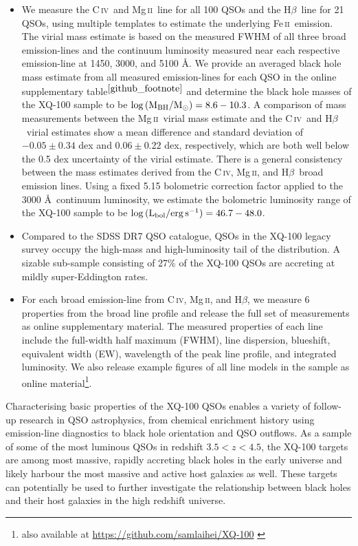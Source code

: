 \documentclass[fleqn,usenatbib]{mnras}
\newcommand{\mgii}{Mg\,\textsc{ii}}
\newcommand{\civ}{C\,\textsc{iv}}
\newcommand{\feii}{Fe\,\textsc{ii}}
\newcommand{\hbeta}{H\textsc{$\beta$}}
\begin{document}
\begin{itemize}
    \item We measure the \civ\ and \mgii\ line for all 100 QSOs and the \hbeta\ line for 21 QSOs, using multiple templates to estimate the underlying \feii\ emission. The virial mass estimate is based on the measured FWHM of all three broad emission-lines and the continuum luminosity measured near each respective emission-line at 1450, 3000, and 5100 \AA. We provide an averaged black hole mass estimate from all measured emission-lines for each QSO in the online supplementary table$^{\ref{github_footnote}}$ and determine the black hole masses of the XQ-100 sample to be $\log{(\rm{M_{BH}}/\rm{M_\odot})} = 8.6-10.3$. A comparison of mass measurements between the \mgii\ virial mass estimate and the \civ\ and \hbeta\ virial estimates show a mean difference and standard deviation of $-0.05 \pm 0.34$ dex and $0.06 \pm 0.22$ dex, respectively, which are both well below the 0.5 dex uncertainty of the virial estimate. There is a general consistency between the mass estimates derived from the \civ, \mgii, and \hbeta\ broad emission lines. Using a fixed 5.15 bolometric correction factor applied to the 3000 \AA\ continuum luminosity, we estimate the bolometric luminosity range of the XQ-100 sample to be $\log{(\rm{L_{bol}}/\rm{erg\,s^{-1}})} = 46.7-48.0$.
    \item Compared to the SDSS DR7 QSO catalogue, QSOs in the XQ-100 legacy survey occupy the high-mass and high-luminosity tail of the distribution. A sizable sub-sample consisting of 27\% of the XQ-100 QSOs are accreting at mildly super-Eddington rates. 
    \item For each broad emission-line from \civ, \mgii, and \hbeta, we measure 6 properties from the broad line profile and release the full set of measurements as online supplementary material. The measured properties of each line include the full-width half maximum (FWHM), line dispersion, blueshift, equivalent width (EW), wavelength of the peak line profile, and integrated luminosity. We also release example figures of all line models in the sample as online material\footnote{also available at \href{https://github.com/samlaihei/XQ-100}{https://github.com/samlaihei/XQ-100} \label{github_footnote}}.
\end{itemize}

Characterising basic properties of the XQ-100 QSOs enables a variety of follow-up research in QSO astrophysics, from chemical enrichment history using emission-line diagnostics to black hole orientation and QSO outflows. As a sample of some of the most luminous QSOs in redshift $3.5 < z < 4.5$, the XQ-100 targets are among most massive, rapidly accreting black holes in the early universe and likely harbour the most massive and active host galaxies as well. These targets can potentially be used to further investigate the relationship between black holes and their host galaxies in the high redshift universe.
\end{document}
